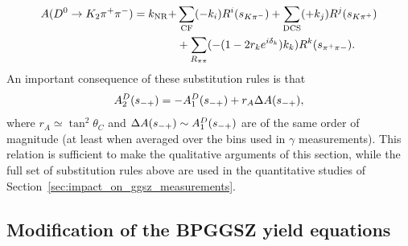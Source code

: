 \begin{align}\label{eq:amplitude_2}
\begin{split}
    A({{D}^0}\rightarrow K_2 \pi^+\pi^-) = k_\mathrm{NR} + &\sum_\mathrm{CF} (-k_i) R^i(s_{K\pi^-}) + \sum_\mathrm{DCS} (+k_j) R^j(s_{K\pi^+}) \\
    &+ \sum_{R_{\pi\pi}} (-(1-2r_ke^{i\delta_k})k_k) R^k(s_{\pi^+\pi-}).
  \end{split}
\end{align}
An important consequence of these substitution rules is that
\begin{align}\label{eq:A1_A2_relation}
    A^{D}_2(s_{-+}) = -A^{D}_1(s_{-+})+r_A \Delta A(s_{-+}),
\end{align}
where $r_A\simeq\tan^2\theta_C $ and $\Delta A(s_{-+})\sim A^{D}_1(s_{-+})$ are of the same order of magnitude (at least when averaged over the bins used in $\gamma$ measurements). 
This relation is sufficient to make the qualitative arguments of this section, while the full set of substitution rules above are used in the quantitative studies of Section~\ref{sec:impact_on_ggsz_measurements}.


\subsection{Modification of the BPGGSZ yield equations} %
\label{sub:modification_of_the_bpggsz_yield_equations}




